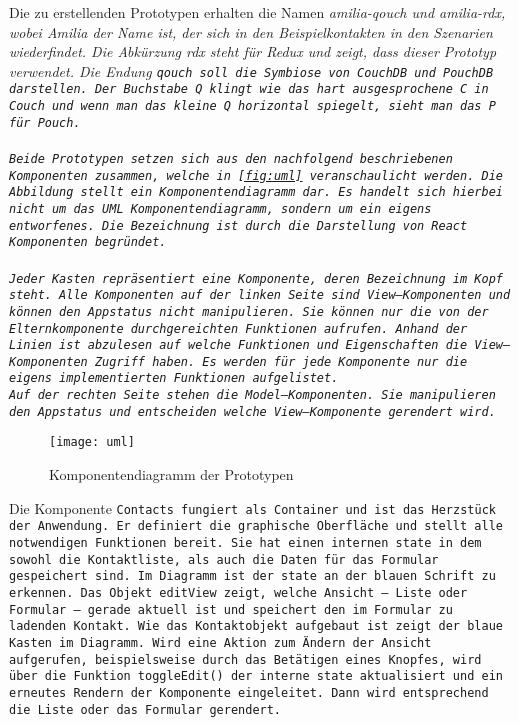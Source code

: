 Die zu erstellenden Prototypen erhalten die Namen \it{amilia-qouch} und \it{amilia-rdx}, wobei Amilia der Name ist, der sich in den Beispielkontakten in den Szenarien wiederfindet. Die Abkürzung \it{rdx} steht für Redux und zeigt, dass dieser Prototyp  verwendet. Die Endung \tt{qouch} soll die Symbiose von CouchDB und PouchDB darstellen. Der Buchstabe Q klingt wie das hart ausgesprochene C in Couch und wenn man das kleine Q horizontal spiegelt, sieht man das P für Pouch.\\\\
Beide Prototypen setzen sich aus den nachfolgend beschriebenen Komponenten zusammen, welche in \autoref{fig:uml} veranschaulicht werden. Die Abbildung stellt ein Komponentendiagramm dar. Es handelt sich hierbei nicht um das UML Komponentendiagramm, sondern um ein eigens entworfenes. Die Bezeichnung ist durch die Darstellung von React Komponenten begründet.\\\\
Jeder Kasten repräsentiert eine Komponente, deren Bezeichnung im Kopf steht.
Alle Komponenten auf der linken Seite sind View--Komponenten und können den Appstatus nicht manipulieren. Sie können nur die von der Elternkomponente durchgereichten Funktionen aufrufen.
Anhand der Linien ist abzulesen auf welche Funktionen und Eigenschaften die View--Komponenten Zugriff haben. Es werden für jede Komponente nur die eigens implementierten Funktionen aufgelistet.\\
Auf der rechten Seite stehen die Model--Komponenten. Sie manipulieren den Appstatus und entscheiden welche View--Komponente gerendert wird.
%
\begin{figure}[ht]
  \centering
  \texttt{[image: uml]}
  \grayRule
  \caption[Komponentendiagramm]{Komponentendiagramm der Prototypen}
  \label{fig:uml}
\end{figure}
%
Die Komponente \tt{Contacts} fungiert als Container und ist das Herzstück der Anwendung. Er definiert die graphische Oberfläche und stellt alle notwendigen Funktionen bereit. Sie hat einen internen \tt{state} in dem sowohl die Kontaktliste, als auch die Daten für das Formular gespeichert sind. Im Diagramm ist der \tt{state} an der blauen Schrift zu erkennen.
Das Objekt \tt{editView} zeigt, welche Ansicht -- Liste oder Formular -- gerade aktuell ist und speichert den im Formular zu ladenden Kontakt.
Wie das Kontaktobjekt aufgebaut ist zeigt der blaue Kasten im Diagramm.
Wird eine Aktion zum Ändern der Ansicht aufgerufen, beispielsweise durch das Betätigen eines Knopfes, wird über die Funktion \tt{toggleEdit()} der interne \tt{state} aktualisiert und ein erneutes Rendern der Komponente eingeleitet. Dann wird entsprechend die Liste oder das Formular gerendert.\\

